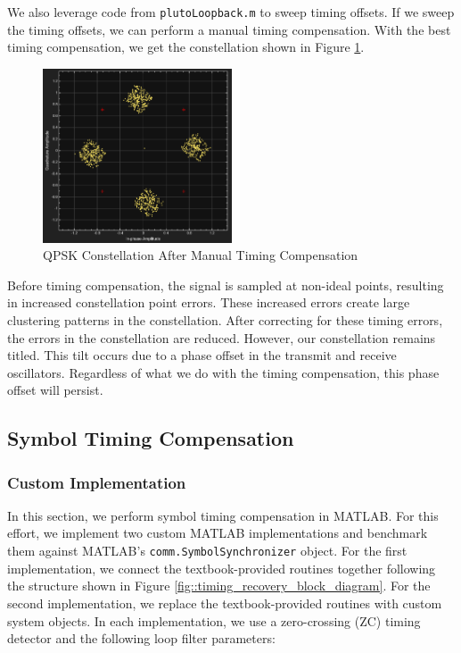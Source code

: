 \documentclass{article}
\begin{document}
\noindent We also leverage code from \texttt{plutoLoopback.m} to sweep timing offsets. If we sweep the timing offsets, we can perform a manual timing compensation. With the best timing compensation, we get the constellation shown in Figure \ref{fig::pluto_constellation_best}.

\begin{figure}[H]
	\centerline{\includegraphics[width=0.5\textwidth]{pluto_constellation_best.png}}
	\caption{QPSK Constellation After Manual Timing Compensation}
	\label{fig::pluto_constellation_best}
\end{figure}

\noindent Before timing compensation, the signal is sampled at non-ideal points, resulting in increased constellation point errors. These increased errors create large clustering patterns in the constellation. After correcting for these timing errors, the errors in the constellation are reduced. However, our constellation remains titled. This tilt occurs due to a phase offset in the transmit and receive oscillators. Regardless of what we do with the timing compensation, this phase offset will persist.

\subsection{Symbol Timing Compensation}

\subsubsection{Custom Implementation}

In this section, we perform symbol timing compensation in MATLAB. For this effort, we implement two custom MATLAB implementations and benchmark them against MATLAB's \texttt{comm.SymbolSynchronizer} object. For the first implementation, we connect the textbook-provided routines together following the structure shown in Figure \ref{fig::timing_recovery_block_diagram}. For the second implementation, we replace the textbook-provided routines with custom system objects. In each implementation, we use a zero-crossing (ZC) timing detector and the following loop filter parameters:
\end{document}
